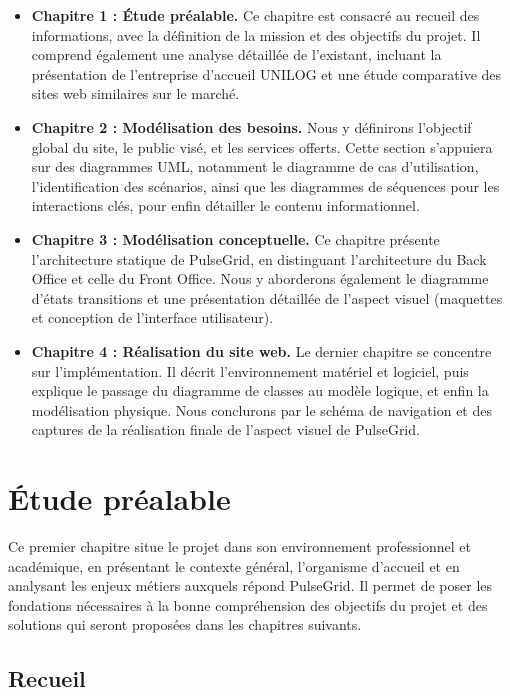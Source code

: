 ﻿\documentclass[12pt,a4paper,oneside]{report} %
\begin{document}
\begin{itemize}
    \item \textbf{Chapitre 1 : Étude préalable.} Ce chapitre est consacré au recueil des informations, avec la définition de la mission et des objectifs du projet. Il comprend également une analyse détaillée de l'existant, incluant la présentation de l'entreprise d'accueil UNILOG et une étude comparative des sites web similaires sur le marché.
    \item \textbf{Chapitre 2 : Modélisation des besoins.} Nous y définirons l'objectif global du site, le public visé, et les services offerts. Cette section s'appuiera sur des diagrammes UML, notamment le diagramme de cas d'utilisation, l'identification des scénarios, ainsi que les diagrammes de séquences pour les interactions clés, pour enfin détailler le contenu informationnel.
    \item \textbf{Chapitre 3 : Modélisation conceptuelle.} Ce chapitre présente l'architecture statique de PulseGrid, en distinguant l'architecture du Back Office et celle du Front Office. Nous y aborderons également le diagramme d'états transitions et une présentation détaillée de l'aspect visuel (maquettes et conception de l'interface utilisateur).
    \item \textbf{Chapitre 4 : Réalisation du site web.} Le dernier chapitre se concentre sur l'implémentation. Il décrit l'environnement matériel et logiciel, puis explique le passage du diagramme de classes au modèle logique, et enfin la modélisation physique. Nous conclurons par le schéma de navigation et des captures de la réalisation finale de l'aspect visuel de PulseGrid.
\end{itemize}

\chapter{Étude préalable}

Ce premier chapitre situe le projet dans son environnement professionnel et académique, en présentant le contexte général, l'organisme d'accueil et en analysant les enjeux métiers auxquels répond PulseGrid. Il permet de poser les fondations nécessaires à la bonne compréhension des objectifs du projet et des solutions qui seront proposées dans les chapitres suivants.

\section{Recueil}
\end{document}
